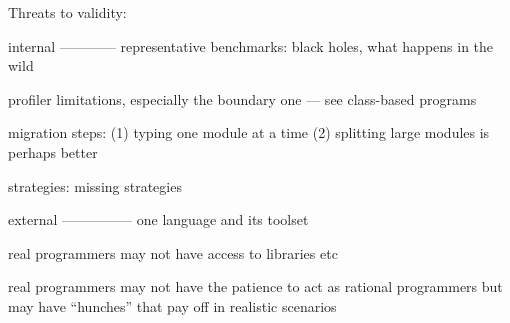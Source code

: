 Threats to validity:

internal
————
representative benchmarks: black holes, what happens in the wild 


profiler limitations, especially the boundary one — see class-based
programs

migration steps: (1) typing one module at a time 
                 (2) splitting large modules is perhaps better

strategies: missing strategies


external
—————
one language and its toolset 

real programmers may not have access to libraries etc

real programmers may not have the patience to act as rational programmers
but may have ``hunches'' that pay off in realistic scenarios 


